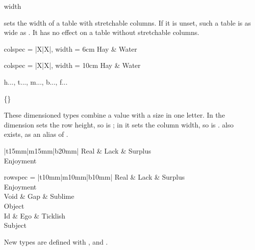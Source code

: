 \begin{codedescribe}[
    key,
    new=2021B
  ]{width}
  \begin{codesyntax}
  \end{codesyntax}
   sets the width of a table with stretchable columns. If it is unset, such a table is as wide as . It has no effect on a table without stretchable columns.

  \begin{codestore}[st=types:width]
    \begin{tblr}{colspec = {|X|X|}, width = 6cm}
      Hay & Water
    \end{tblr}

    \begin{tblr}{colspec = {|X|X|}, width = 10cm}
      Hay & Water
    \end{tblr}\end{codestore}
  \begin{center}
  \end{center}
\end{codedescribe}

\begin{codedescribe}[
    code,
    no index,
    new=2021B,
    update=2021F,
    update=2021G
  ]{h{...}, t{...}, m{...}, b{...}, f{...}}
  \begin{codesyntax}
    \{\}
  \end{codesyntax}
  These dimensioned types combine a  value with a size in one letter. In  the dimension sets the row height, so  is ; in  it sets the column width, so  is .  also exists, as an alias of .

  \begin{codestore}[st=types:dim]
    \begin{tblr}{|t{15mm}|m{15mm}|b{20mm}|}
      Real & Lack & {Surplus \\Enjoyment}
    \end{tblr}\quad
    \begin{tblr}{rowspec = {|t{10mm}|m{10mm}|b{10mm}|}}
      Real & Lack & {Surplus  \\Enjoyment} \\
      Void & Gap  & {Sublime  \\Object}    \\
      Id   & Ego  & {Ticklish \\Subject}
    \end{tblr}\end{codestore}
  \begin{center}
  \end{center}
  \begin{tsremark}
    New types are defined with ,  and .
  \end{tsremark}
\end{codedescribe}

